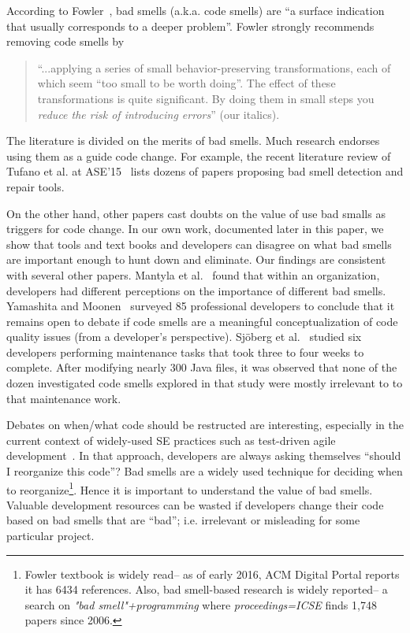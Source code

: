 \documentclass{sig-alternate}
\begin{document}



\noindent
According to   Fowler~\cite{fowler99}, bad smells (a.k.a. code smells)
are ``a surface indication that usually corresponds to a deeper problem''.
Fowler strongly recommends   removing   code smells   by
\begin{quote}
``...applying a series of small behavior-preserving transformations, each 
of which seem ``too small to be worth doing''. 
The  effect of   these transformations is quite significant. By doing them in small steps you {\em reduce the risk of introducing errors}'' (our italics).
\end{quote}
The literature is divided on the merits of bad smells.
Much research  endorses using them as a guide
code change. For example,
the recent literature review of Tufano et al. at ASE'15~\cite{Tufano2015}  
lists dozens of  
papers proposing bad smell detection and repair tools. 

On the other hand, other papers cast doubts on the value of use bad smalls
as triggers for code change.
In our own work, documented later in this paper, we  show
that tools and text books and developers can disagree on what bad smells
are important enough to hunt down and eliminate. Our findings
are consistent with several other papers.
Mantyla et al.~\cite{Mantyla2004} found that within an organization,
 developers had different perceptions on the importance of different
 bad smells.    Yamashita  and Moonen~\cite{Yamashita2013}
 surveyed 85 professional developers to conclude that it remains
 open to debate if code smells are a meaningful conceptualization  of code quality issues (from a developer's perspective). 
 Sj\"oberg et al.~\cite{Sjoberg2013} studied six developers 
 performing maintenance tasks that took three to four weeks to complete. 
 After modifying nearly 300 Java files, it was observed
 that none of the dozen investigated code smells explored in 
 that study were mostly irrelevant to to that maintenance work.
 
Debates on when/what code should be restructed are interesting, especially
in the current context of  widely-used SE practices such as
test-driven agile development~\cite{beck2003test,janzen05,williams2003test,george2003initial}.
In that approach, developers are always asking themselves ``should I reorganize this code''?
Bad smells are a widely used  technique for deciding when to reorganize\footnote{Fowler textbook is widely read-- as of  early 2016, ACM Digital Portal reports 
it has 6434 references. Also, bad smell-based research
is widely reported-- a search  on {\em "bad smell"+programming} 
where {\em proceedings=ICSE} finds 1,748 papers since 2006.}.
Hence it is important to understand the value of
 bad smells.  
Valuable development resources can be wasted if developers
change their code based on   bad smells that are ``bad''; i.e. 
 irrelevant or misleading
for some particular project.
 
\end{document}
